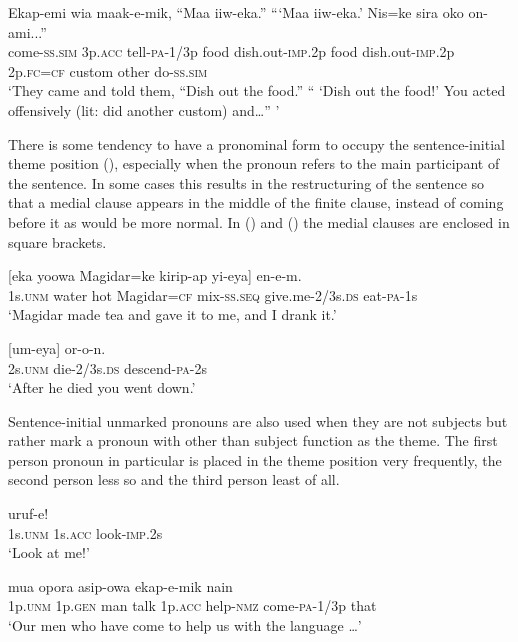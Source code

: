 \ea%
\label{ex:x1779}
\gll Ekap-emi wia maak-e-mik, ``Maa iiw-eka.'' ```Maa iiw-eka.' Nis=ke sira oko on-ami...''\\
come-\textsc{ss}.\textsc{sim} 3p.\textsc{acc} tell-\textsc{pa}-1/3p food dish.out-\textsc{imp}.2p food dish.out-\textsc{imp}.2p 2p.\textsc{fc}=\textsc{cf} custom other do-\textsc{ss}.\textsc{sim}\\
\glt`They came and told them, ``Dish out the food.'' `` `Dish out the food!' You acted offensively (lit: did another custom) and{\dots}'' '
\z

There is some tendency to have a pronominal form to occupy the sentence-initial theme position (), especially when the pronoun refers to the main participant of the sentence. In some cases this results in the restructuring of the sentence so that a medial clause appears in the middle of the finite clause, instead of coming before it as would be more normal. In () and () the medial clauses are enclosed in square brackets. 

\ea%
\label{ex:x539}
\gll {} [eka yoowa Magidar=ke kirip-ap yi-eya] en-e-m.\\
1s.\textsc{unm} water hot Magidar=\textsc{cf} mix-\textsc{ss}.\textsc{seq} give.me-2/3s.\textsc{ds} eat-\textsc{pa}-1s\\
\glt`Magidar made tea and gave it to me, and I drank it.'
\z

\ea%
\label{ex:x540}
\gll {} [um-eya] or-o-n. \\
2s.\textsc{unm} die-2/3s.\textsc{ds} descend-\textsc{pa}-2s\\
\glt`After he died you went down.'
\z

Sentence-initial unmarked pronouns are also used when they are not subjects but rather mark a pronoun with other than subject function as the theme. The first person pronoun in particular is placed in the theme position very frequently, the second person less so and the third person least of all.

\ea%
\label{ex:x535}
\gll {}  uruf-e! \\
1s.\textsc{unm} 1s.\textsc{acc} look-\textsc{imp}.2s\\
\glt`Look at me!'
\z

\ea%
\label{ex:x536}
\gll {}  mua opora  asip-owa ekap-e-mik nain \\
1p.\textsc{unm} 1p.\textsc{gen} man talk 1p.\textsc{acc} help-\textsc{nmz} come-\textsc{pa}-1/3p that\\
\glt`Our men who have come to help us with the language {\dots}'
\z


